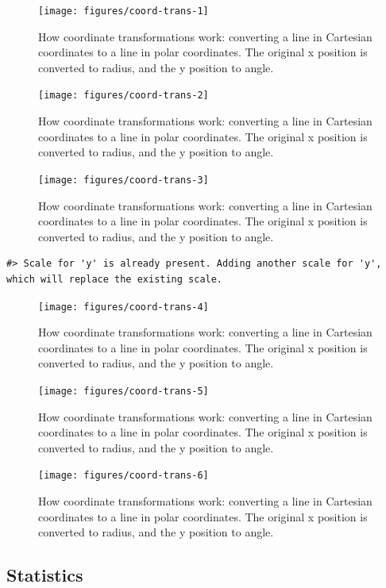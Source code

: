 \begin{figure}
\texttt{[image: figures/coord-trans-1]} \caption{How coordinate transformations work: converting a line in Cartesian coordinates to a line in polar coordinates.  The original x position is converted to radius, and the y position to angle.\label{fig:coord-trans1}}
\end{figure}\begin{figure}
\texttt{[image: figures/coord-trans-2]} \caption{How coordinate transformations work: converting a line in Cartesian coordinates to a line in polar coordinates.  The original x position is converted to radius, and the y position to angle.\label{fig:coord-trans2}}
\end{figure}\begin{figure}
\texttt{[image: figures/coord-trans-3]} \caption{How coordinate transformations work: converting a line in Cartesian coordinates to a line in polar coordinates.  The original x position is converted to radius, and the y position to angle.\label{fig:coord-trans3}}
\end{figure}

\begin{verbatim}
#> Scale for 'y' is already present. Adding another scale for 'y', which will replace the existing scale.
\end{verbatim}

\begin{figure}
\texttt{[image: figures/coord-trans-4]} \caption{How coordinate transformations work: converting a line in Cartesian coordinates to a line in polar coordinates.  The original x position is converted to radius, and the y position to angle.\label{fig:coord-trans4}}
\end{figure}\begin{figure}
\texttt{[image: figures/coord-trans-5]} \caption{How coordinate transformations work: converting a line in Cartesian coordinates to a line in polar coordinates.  The original x position is converted to radius, and the y position to angle.\label{fig:coord-trans5}}
\end{figure}\begin{figure}
\texttt{[image: figures/coord-trans-6]} \caption{How coordinate transformations work: converting a line in Cartesian coordinates to a line in polar coordinates.  The original x position is converted to radius, and the y position to angle.\label{fig:coord-trans6}}
\end{figure}

\subsection{Statistics}\label{sub:statistics}


